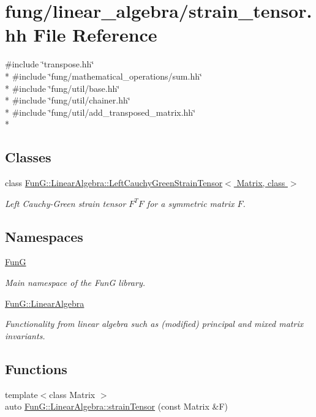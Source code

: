 \hypertarget{strain__tensor_8hh}{}\section{fung/linear\+\_\+algebra/strain\+\_\+tensor.hh File Reference}
\label{strain__tensor_8hh}
{\ttfamily \#include \char`\"{}transpose.\+hh\char`\"{}}\\*
{\ttfamily \#include \char`\"{}fung/mathematical\+\_\+operations/sum.\+hh\char`\"{}}\\*
{\ttfamily \#include \char`\"{}fung/util/base.\+hh\char`\"{}}\\*
{\ttfamily \#include \char`\"{}fung/util/chainer.\+hh\char`\"{}}\\*
{\ttfamily \#include \char`\"{}fung/util/add\+\_\+transposed\+\_\+matrix.\+hh\char`\"{}}\\*
\subsection*{Classes}
\begin{DoxyCompactItemize}
\item 
class \hyperlink{classFunG_1_1LinearAlgebra_1_1LeftCauchyGreenStrainTensor}{Fun\+G\+::\+Linear\+Algebra\+::\+Left\+Cauchy\+Green\+Strain\+Tensor$<$ Matrix, class $>$}
\begin{DoxyCompactList}\small\item\em Left Cauchy-\/\+Green strain tensor $ F^T F $ for a symmetric matrix $ F $. \end{DoxyCompactList}\end{DoxyCompactItemize}
\subsection*{Namespaces}
\begin{DoxyCompactItemize}
\item 
 \hyperlink{namespaceFunG}{Fun\+G}
\begin{DoxyCompactList}\small\item\em Main namespace of the Fun\+G library. \end{DoxyCompactList}\item 
 \hyperlink{namespaceFunG_1_1LinearAlgebra}{Fun\+G\+::\+Linear\+Algebra}
\begin{DoxyCompactList}\small\item\em Functionality from linear algebra such as (modified) principal and mixed matrix invariants. \end{DoxyCompactList}\end{DoxyCompactItemize}
\subsection*{Functions}
\begin{DoxyCompactItemize}
\item 
{\footnotesize template$<$class Matrix $>$ }\\auto \hyperlink{namespaceFunG_1_1LinearAlgebra_aca163950a2c0cb159fb83629b08337ba}{Fun\+G\+::\+Linear\+Algebra\+::strain\+Tensor} (const Matrix \&F)
\end{DoxyCompactItemize}
